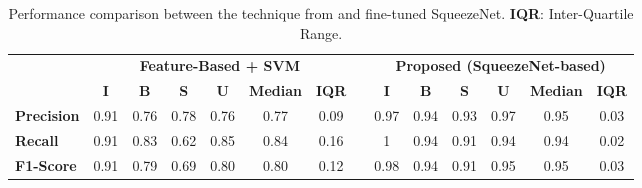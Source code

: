 \begin{table*}[!b]  %
	\centering
\caption{Performance comparison between the technique from \cite{moccia_learning-based_2018} and fine-tuned SqueezeNet. \textbf{IQR}: Inter-Quartile Range.}
\begin{tabular}{l cccccc c cccccc }
 & \multicolumn{6}{c}{\textbf{Feature-Based + SVM} \cite{moccia_learning-based_2018} } & & \multicolumn{6}{c}{\textbf{Proposed (SqueezeNet-based)}} \\
\cmidrule(lr){2-7} \cmidrule(lr){9-14}
& \textbf{I}   & \textbf{B}  & \textbf{S} & \textbf{U} & \textbf{Median} &\textbf{IQR}& &\textbf{I}   & \textbf{B}  & \textbf{S} & \textbf{U} & \textbf{Median} &\textbf{IQR}\\
\cmidrule(lr){1-7} \cmidrule(lr){9-14}
\textbf{Precision}  & 0.91 & 0.76 & 0.78 & 0.76 & 0.77 & 0.09 & & 0.97 & 0.94 & 0.93 & 0.97 & 0.95 & 0.03 \\
\textbf{Recall}       & 0.91 & 0.83 & 0.62 & 0.85 & 0.84 & 0.16 & & 1 & 0.94 & 0.91 & 0.94 & 0.94 & 0.02 \\
\textbf{F1-Score}   & 0.91 & 0.79 & 0.69 & 0.80 & 0.80 & 0.12 & & 0.98 & 0.94 & 0.91 & 0.95 & 0.95 & 0.03 \\
\bottomrule
\end{tabular}
\label{tab_1_results}
\end{table*}%

